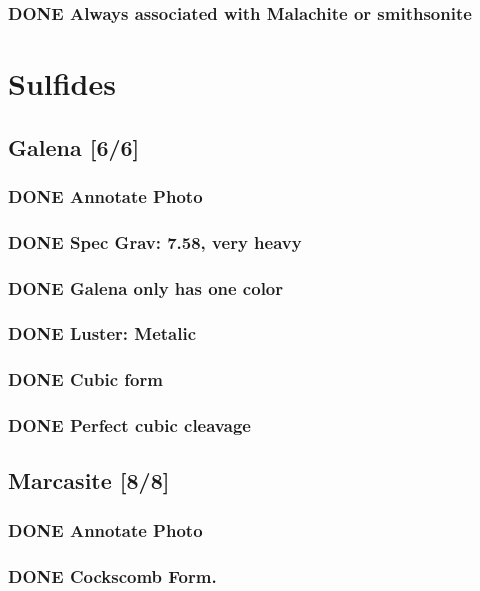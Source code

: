 \documentclass[11pt]{article}
\begin{document}
\subsubsection{{\bfseries\sffamily DONE} Always associated with Malachite or smithsonite}
\label{sec-1-2-6}

\section{Sulfides}
\label{sec-2}
\subsection{Galena [6/6]}
\label{sec-2-1}
\subsubsection{{\bfseries\sffamily DONE} Annotate Photo}
\label{sec-2-1-1}
\subsubsection{{\bfseries\sffamily DONE} Spec Grav: 7.58, very heavy}
\label{sec-2-1-2}
\subsubsection{{\bfseries\sffamily DONE} Galena only  has one color}
\label{sec-2-1-3}
\subsubsection{{\bfseries\sffamily DONE} Luster: Metalic}
\label{sec-2-1-4}
\subsubsection{{\bfseries\sffamily DONE} Cubic form}
\label{sec-2-1-5}
\subsubsection{{\bfseries\sffamily DONE} Perfect cubic cleavage}
\label{sec-2-1-6}
\subsection{Marcasite [8/8]}
\label{sec-2-2}
\subsubsection{{\bfseries\sffamily DONE} Annotate Photo}
\label{sec-2-2-1}
\subsubsection{{\bfseries\sffamily DONE} Cockscomb Form.}
\label{sec-2-2-2}
\end{document}
